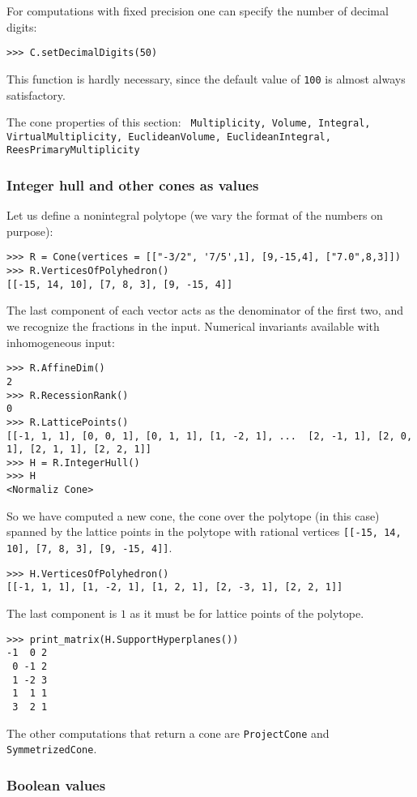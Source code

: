 \documentclass[12pt,a4paper]{scrartcl}
\theoremstyle{definition}
\def\ttt{\texttt}
\begin{document}
\begin{small}
For computations with fixed precision one can specify the number of decimal digits:
\begin{Verbatim}
>>> C.setDecimalDigits(50)
\end{Verbatim}
This function is hardly necessary, since the default value of \ttt{100} is almost always satisfactory.

The cone properties of this section: \ttt{    Multiplicity,
	Volume,
	Integral,
	VirtualMultiplicity,
	EuclideanVolume,
	EuclideanIntegral,
	ReesPrimaryMultiplicity
}

\subsubsection{Integer hull and other cones as values}

Let us define a nonintegral polytope (we vary the format of the numbers on purpose):
\begin{Verbatim}
>>> R = Cone(vertices = [["-3/2", '7/5',1], [9,-15,4], ["7.0",8,3]])
>>> R.VerticesOfPolyhedron()
[[-15, 14, 10], [7, 8, 3], [9, -15, 4]]
\end{Verbatim}
The last component of each vector acts as the denominator of the first two, and we recognize the fractions in the input. Numerical invariants available with inhomogeneous input:
\begin{Verbatim}
>>> R.AffineDim()
2
>>> R.RecessionRank()
0
>>> R.LatticePoints()
[[-1, 1, 1], [0, 0, 1], [0, 1, 1], [1, -2, 1], ...  [2, -1, 1], [2, 0, 1], [2, 1, 1], [2, 2, 1]]
>>> H = R.IntegerHull()
>>> H
<Normaliz Cone>
\end{Verbatim}
So we have computed a new cone, the cone over the polytope (in this case) spanned by the lattice points in the polytope with rational vertices \verb|[[-15, 14, 10], [7, 8, 3], [9, -15, 4]]|.
\begin{Verbatim}
>>> H.VerticesOfPolyhedron()
[[-1, 1, 1], [1, -2, 1], [1, 2, 1], [2, -3, 1], [2, 2, 1]]
\end{Verbatim}
The last component is $1$ as it must be for lattice points of the polytope.
\begin{Verbatim}
>>> print_matrix(H.SupportHyperplanes())
-1  0 2
 0 -1 2
 1 -2 3
 1  1 1
 3  2 1
\end{Verbatim}

The other computations that return a cone are \verb|ProjectCone| and \verb|SymmetrizedCone|.

\subsubsection{Boolean values}


\end{small}
\end{document}
